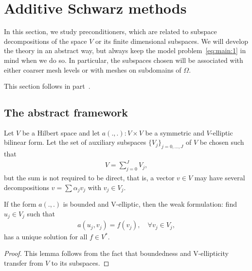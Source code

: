 
\section{Additive Schwarz methods}

\begin{intro}
  In this section, we study preconditioners, which are related to
  subspace decompositions of the space $V$ or its finite dimensional
  subspaces. We will develop the theory in an abstract way, but always
  keep the model problem~\eqref{eq:main:1} in mind when we do so. In
  particular, the subspaces chosen will be associated with either
  coarser mesh levels or with meshes on subdomains of $\Omega$.
  
  This section follows in part~\cite[Chapter 7]{BrennerScott02}.
\end{intro}

\subsection{The abstract framework}

\begin{intro}
  Let $V$ be a Hilbert space and let $a(.,.): V\times V$ be a
  symmetric and $V$-elliptic bilinear form. Let the set of auxiliary
  subspaces $\{V_j\}_{j=0,\dots,J}$ of $V$ be chosen such that
  \begin{gather*}
    V = \sum_{j=0}^J V_j,
  \end{gather*}
  but the sum is not required to be direct, that is, a vector $v\in V$
  may have several decompositions $v = \sum \alpha_j v_j$ with $v_j\in
  V_j$.
\end{intro}

\begin{lemma}
  If the form $a(.,.)$ is bounded and V-elliptic, then the weak
  formulation: find $u_j\in V_j$ such that
  \begin{gather}
    \label{eq:schwarz:1}
    a(u_j,v_j) = f(v_j),
    \quad\forall v_j\in V_j,
  \end{gather}
  has a unique solution for all $f\in V^*$.
\end{lemma}

\begin{proof}
  This lemma follows from the fact that boundedness and V-ellipticity
  transfer from $V$ to its subspaces.
\end{proof}

